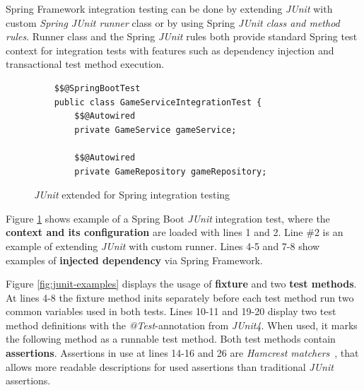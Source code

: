     Spring Framework integration testing can be done by extending \textit{JUnit} with custom \textit{Spring JUnit runner} class or by using Spring \textit{JUnit class and
    method rules}. Runner class and the Spring \textit{JUnit} rules both provide standard Spring test context
    for integration tests with features such as dependency injection and transactional test method execution. ~\cite{springintegration}

    \begin{figure}[ht]
        \begin{lstlisting}[style=java]
    %%@RunWith%%(SpringJUnit4ClassRunner.class)
    $$@SpringBootTest
    public class GameServiceIntegrationTest {
        $$@Autowired
        private GameService gameService;

        $$@Autowired
        private GameRepository gameRepository;
        \end{lstlisting}
        \caption{\textit{JUnit} extended for Spring integration testing}
        \label{fig:springrunner}
    \end{figure}

    Figure \ref{fig:springrunner} shows example of a Spring Boot \textit{JUnit} integration test, where the \textbf{context and its configuration} are
    loaded with lines 1 and 2. Line \#2 is an example of extending \textit{JUnit} with custom runner. Lines 4-5 and 7-8 show
    examples of \textbf{injected dependency} via Spring Framework.

    Figure \ref{fig:junit-examples} displays the usage of \textbf{fixture} and two \textbf{test methods}. At lines 4-8 the fixture method
    inits separately before each test method run two common variables used in both tests. Lines 10-11 and 19-20 display two test method definitions with the
    \textit{@Test}-annotation from \textit{JUnit4}. When used, it marks the following method as a runnable test method. Both test methods
    contain \textbf{assertions}. Assertions in use at lines 14-16 and 26 are \textit{Hamcrest matchers}~\cite{hamcrest}, that
    allows more readable descriptions for used assertions than traditional \textit{JUnit} assertions.

